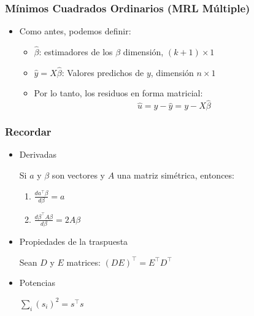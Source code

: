 \documentclass{beamer}
\begin{document}
\begin{frame}
\frametitle{Mínimos Cuadrados Ordinarios (MRL Múltiple)}

\begin{itemize}
    
    \item Como antes, podemos definir:
    \begin{itemize}
        \item $\hat{\beta}$: estimadores de los $\beta$ dimensión, $(k+1) \times 1$
        \item $\hat{y} = X \hat{\beta}$: Valores predichos de $y$, dimensi\'on $n \times 1$
        \item Por lo tanto, los residuos en forma matricial:
        \[ \hat{u} = y - \hat{y} = y - X \hat{\beta} \]
    \end{itemize}
\end{itemize}

\end{frame}
\begin{frame}
\frametitle{Recordar}

\begin{itemize}
    \item {\color{blue} Derivadas}
    
    Si $a$ y $\beta$ son vectores y $A$ una matriz simétrica, entonces:

\begin{enumerate}
    \item $\frac{da^\top \beta}{d\beta} = a$
    \item $\frac{d\beta^\top A\beta}{d\beta} = 2A\beta$
\end{enumerate}
\item {\color{blue}Propiedades de la traspuesta}
 
 Sean $D$ y $E$ matrices: $(DE)^\top = E^\top D^\top$
 \item {\color{blue}Potencias}
 
 $\sum_{i} (s_i)^2 = s^\top s$   
\end{itemize}


   
\end{frame}
\end{document}
